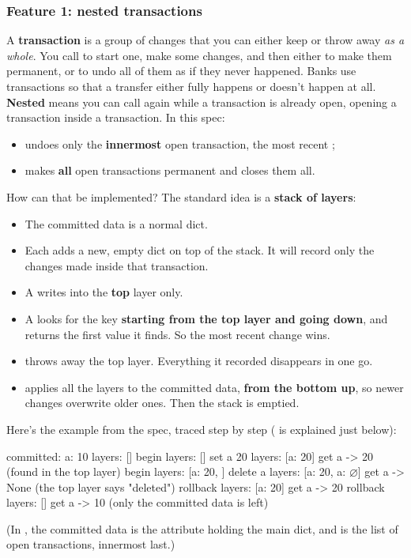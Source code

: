 \documentclass[10pt,a4paper]{article}
\begin{document}
\subsubsection{Feature 1: nested transactions}
A \textbf{transaction} is a group of changes that you can either keep or throw away \emph{as a whole}. You call  to start one, make some changes, and then either  to make them permanent, or  to undo all of them as if they never happened. Banks use transactions so that a transfer either fully happens or doesn’t happen at all.
\textbf{Nested} means you can call  again while a transaction is already open, opening a transaction inside a transaction. In this spec:
\begin{itemize}
\item {} undoes only the \textbf{innermost} open transaction, the most recent ;
\item {} makes \textbf{all} open transactions permanent and closes them all.
\end{itemize}
How can that be implemented? The standard idea is a \textbf{stack of layers}:
\begin{itemize}
\item The committed data is a normal dict.
\item Each  adds a new, empty dict on top of the stack. It will record only the changes made inside that transaction.
\item A  writes into the \textbf{top} layer only.
\item A  looks for the key \textbf{starting from the top layer and going down}, and returns the first value it finds. So the most recent change wins.
\item {} throws away the top layer. Everything it recorded disappears in one go.
\item {} applies all the layers to the committed data, \textbf{from the bottom up}, so newer changes overwrite older ones. Then the stack is emptied.
\end{itemize}
Here’s the example from the spec, traced step by step ( is explained just below):
\begin{txtcode}
committed: {a: 10}         layers: []
begin                      layers: [{}]
set a 20                   layers: [{a: 20}]           get a -> 20   (found in the top layer)
begin                      layers: [{a: 20}, {}]
delete a                   layers: [{a: 20}, {a: ⌀}]   get a -> None (the top layer says "deleted")
rollback                   layers: [{a: 20}]           get a -> 20
rollback                   layers: []                  get a -> 10   (only the committed data is left)
\end{txtcode}
(In , the committed data is the attribute holding the main dict, and  is the list of open transactions, innermost last.)
\end{document}
